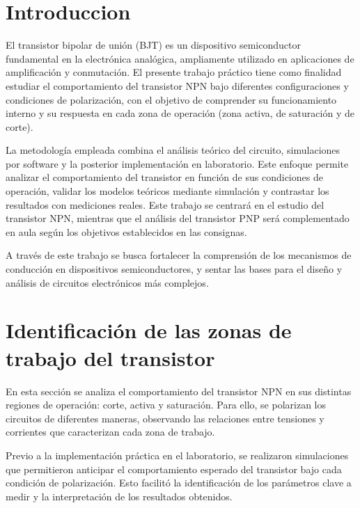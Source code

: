 \documentclass[chaptersright]{informeutn}
\begin{document}
\maketitle
\tableofcontents

\chapter{Introduccion}
El transistor bipolar de unión (BJT) es un 
dispositivo semiconductor fundamental en la electrónica analógica, 
ampliamente utilizado en aplicaciones de amplificación y conmutación. El 
presente trabajo práctico tiene como finalidad estudiar el comportamiento 
del transistor NPN bajo diferentes configuraciones y condiciones de 
polarización, con el objetivo de comprender su funcionamiento interno y 
su respuesta en cada zona de operación (zona activa, de saturación y de 
corte).

La metodología empleada combina el análisis teórico del circuito, 
simulaciones por software y la posterior implementación en laboratorio. 
Este enfoque permite analizar el comportamiento del transistor 
en función de sus condiciones de operación, validar los modelos teóricos 
mediante simulación y contrastar los resultados con mediciones reales. 
Este trabajo se centrará en el estudio del transistor NPN, mientras que
el análisis del transistor PNP será complementado en aula según los
objetivos establecidos en las consignas.

A través de este trabajo se busca fortalecer la comprensión de los 
mecanismos de conducción en dispositivos semiconductores, y sentar las 
bases para el diseño y análisis de circuitos electrónicos más complejos.

\chapter{Identificación de las zonas de trabajo del transistor}
En esta sección se analiza el comportamiento del transistor NPN en sus 
distintas regiones de operación: corte, activa y saturación. Para ello, 
se polarizan los circuitos de diferentes maneras, observando las 
relaciones entre tensiones y corrientes que caracterizan cada zona de 
trabajo.

Previo a la implementación práctica en el laboratorio, se realizaron 
simulaciones que permitieron anticipar el comportamiento esperado del 
transistor bajo cada condición de polarización. Esto facilitó la 
identificación de los parámetros clave a medir y la interpretación de los 
resultados obtenidos.
\end{document}
